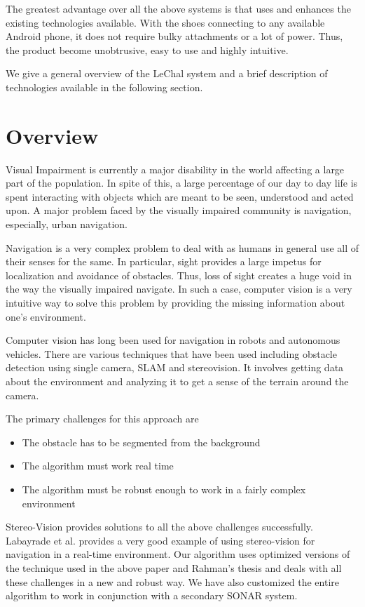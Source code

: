 \documentclass[11pt]{report}
\begin{document}
{The greatest advantage over all the above systems is that uses and enhances the existing technologies available. With the shoes connecting to any available Android phone, it does not require bulky attachments or a lot of power. Thus, the product become unobtrusive, easy to use and highly intuitive.  

We give a general overview of the LeChal system and a brief description of technologies available in the following section.   

\section{Overview}
Visual Impairment is currently a major disability in the world affecting a large part of the population\cite{who}. In spite of this, a large percentage of our day to day life is spent interacting with objects which are meant to be seen, understood and acted upon. A major problem faced by the visually impaired community is navigation, especially, urban navigation. 

Navigation is a very complex problem to deal with as humans in general use all of their senses for the same. In particular, sight provides a large impetus for localization and avoidance of obstacles. Thus, loss of sight creates a huge void in the way the visually impaired navigate. In such a case, computer vision is a very intuitive way to solve this problem by providing the missing information about one's environment.

Computer vision has long been used for navigation in robots and autonomous vehicles\cite{nav1,nav2}. There are various techniques that have been used including obstacle detection using single camera\cite{nav2}, SLAM\cite{slam} and  stereovision\cite{stereo1,outdoorstereo,murray1997stereo,murray2000using}. It involves getting data about the environment and analyzing it to get a sense of the terrain around the camera. 

The primary challenges for this approach are
\begin{itemize}
	\item The obstacle has to be segmented from the background
	\item The algorithm must work real time
	\item The algorithm must be robust enough to work in a fairly complex environment
\end{itemize}

Stereo-Vision provides solutions to all the above challenges successfully. Labayrade et al.\cite{labayrade2002} provides a very good example of using stereo-vision for navigation in a real-time environment. Our algorithm uses optimized versions of the technique used in the above paper and Rahman's thesis\cite{obstacleavoidance} and  deals with all these challenges in a new and robust way. We have also customized the entire algorithm to work in conjunction with a secondary SONAR system. 

}
\end{document}
